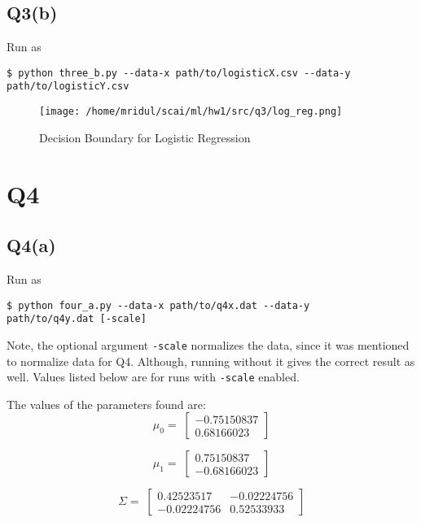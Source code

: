 \documentclass[11pt]{article}
\begin{document}
\subsection{Q3(b)}
\label{sec:orgeaf4eb5}
\begin{codebox}
Run as
\begin{verbatim}
$ python three_b.py --data-x path/to/logisticX.csv --data-y
path/to/logisticY.csv
\end{verbatim}
\end{codebox}
\begin{figure}[!ht]
\centering
\texttt{[image: /home/mridul/scai/ml/hw1/src/q3/log\_reg.png]}
\caption{\label{fig:org09442ad}Decision Boundary for Logistic Regression}
\end{figure}
\clearpage
\section{Q4}
\label{sec:orgfd67199}
\subsection{Q4(a)}
\label{sec:orgc60505f}
\begin{codebox}
Run as
\begin{verbatim}
$ python four_a.py --data-x path/to/q4x.dat --data-y
path/to/q4y.dat [-scale]
\end{verbatim}
Note, the optional argument \verb|-scale| normalizes the
data, since it was mentioned to normalize data for Q4.
Although, running without it gives the correct result as
well. Values listed below are for runs with \verb|-scale|
enabled.
\end{codebox}
The values of the parameters found are:
\begin{equation*}
\mu_0 = \;
\begin{bmatrix}
-0.75150837\\
0.68166023
\end{bmatrix}
\end{equation*}

\begin{equation*}
\mu_1 = \;
\begin{bmatrix}
0.75150837\\
-0.68166023
\end{bmatrix}
\end{equation*}

\begin{equation*}
\Sigma = \;
\begin{bmatrix}
0.42523517& -0.02224756\\
-0.02224756&  0.52533933
\end{bmatrix}
\end{equation*}
\end{document}
